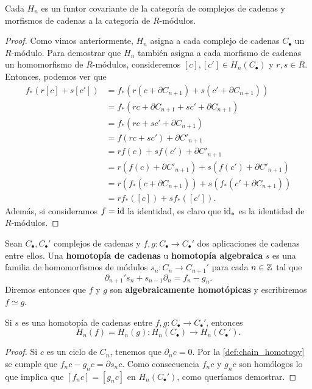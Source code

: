 \begin{proposicion}
	Cada $H_{n}$ es un funtor covariante de la categoría de complejos de cadenas y
	morfismos de cadenas a la categoría de $R$-módulos.
\end{proposicion}
\begin{proof}
	Como vimos anteriormente, $H_{n}$ asigna a cada complejo de cadenas
	$C_{\bullet}$ un $R$-módulo. Para demostrar que $H_{n}$ también asigna a cada morfismo
	de cadenas un homomorfismo de $R$-módulos, consideremos
	$[c], [c'] \in H_{n}(C_{\bullet})$ y $r, s \in R$. Entonces, podemos ver que
	\begin{align}
		f_{*}(r[c] + s[c']) & = f_{*}(r(c + \partial C_{n+1}) + s(c' + \partial C_{n+1}))        \\
		& = f_{*}(rc + \partial C_{n+1}+ sc' + \partial C_{n+1})             \\
		& = f_{*}(rc + sc' + \partial C_{n+1})                               \\
		& = f(rc + sc') + \partial C'_{n+1}                                  \\
		& = rf(c) + sf(c') + \partial C'_{n+1}                               \\
		& = r(f(c) + \partial C'_{n+1}) + s(f(c') + \partial C'_{n+1})       \\
		& = r(f_{*}(c + \partial C_{n+1})) + s(f_{*}(c' + \partial C_{n+1})) \\
		& = rf_{*}([c]) + sf_{*}([c']).
	\end{align}
	Además, si consideramos $f = \operatorname{id}$ la identidad, es claro que $\operatorname{id}_{*}$ es la
	identidad de $R$-módulos.
\end{proof}

\begin{definicion}
	\label{def:chain_homotopy} Sean $C_{\bullet},C_{\bullet}'$ complejos de cadenas
	y $f,g: C_{\bullet}\rightarrow C_{\bullet}'$ dos aplicaciones de cadenas entre
	ellos. Una \textbf{homotopía de cadenas} u \textbf{homotopía algebraica} $s$
	es una familia de homomorfismos de módulos $s_{n}: C_{n}\rightarrow C_{n+1}'$
	para cada $n \in \mathbb{Z}$ tal que
	\begin{equation}
		\partial_{n+1}'s_{n}+ s_{n-1}\partial_{n}= f_{n}- g_{n}.
	\end{equation}
	Diremos entonces que $f$ y $g$ son \textbf{algebraicamente homotópicas} y escribiremos
	$f \simeq g$.
\end{definicion}

\begin{teorema}
	\label{teo:homot-cad-misma-homologia} Si $s$ es una homotopía de cadenas entre
	$f,g: C_{\bullet}\rightarrow C_{\bullet}'$, entonces
	\[
	H_{n}(f) = H_{n}(g) : H_{n}(C_{\bullet}) \rightarrow H_{n}(C_{\bullet}').
	\]
\end{teorema}
\begin{proof}
	Si $c$ es un ciclo de $C_{n}$, tenemos que $\partial_{n}c = 0$. Por la \autoref{def:chain_homotopy}
	se cumple que $f_{n}c-g_{n}c = \partial s_{n}c$. Como consecuencia $f_{n}c$ y
	$g_{n}c$ son homólogos lo que implica que $[f_{n}c] = [g_{n}c]$ en
	$H_{n}(C_{\bullet}')$, como queríamos demostrar.
\end{proof}


